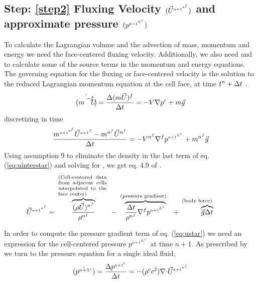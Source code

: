 \documentclass[fleqn]{article}
\begin{document}
\subsection{Step: \ref{step2}  \textsf{Fluxing Velocity $(\ustar)$ and approximate pressure $(\pnnLc)$}}
To calculate the Lagrangian volume and the advection of mass, momentum and
energy we need the face-centered fluxing velocity.  Additionally, we also
need \pstar and \delpc to calculate some of the source terms in the momentum
and energy equations. The governing equation for the fluxing or face-centered
velocity is the solution to the reduced Lagrangian momentum equation at the
cell face, at time $t^n + \delt$ .
%
\begin{equation*}
\dot{(m\vec{U}^{f} )}
= \frac{  \Delta{ (m\vec{U})^{f} }  }{  \delt  } 
= -V\nabla{p^c} + m\vec{g}
\end{equation*}
%
discretizing in time
%
\begin{equation}
\label{eq:uinterstar} 
    \frac{  m^{\nadv^{*^{f}}}\unnf - \mnf\unf  }{  \delt}
    = -\Vnf\nabla^f p^{\nadv^{L^{c}}} + \mnf \vec{g} 
\end{equation}
%
Using assumption 9 to eliminate the density in the last term of eq. (\ref{eq:uinterstar}) and solving for \ustar, we get eq. 4.9 of .
%
\begin{equation}
\label{eq:ustar}
    \ustar = 
    \overbrace{ \frac{ (\rho\vec{U})^{n^{f}} }{ \rhonf} }^{  
    \text{  \pboxsmall{   (Cell-centered data from adjacent cells interpolated to the face center)}  } } 
-   \overbrace{ \frac{ \delt }{\rhonf }\nabla^f\pnnLc  }^{ 
    \text{  \pboxsmall{   (pressure gradient)} } }
+   \overbrace{ \vec{g}  \delt  }^{
    \text{  \pboxsmall{   (body force)}  } }  
\end{equation}

%
In order to compute the pressure gradient term of eq. (\ref{eq:ustar}) we
need an expression for the cell-centered pressure $\pnnLc$ at time $n+1.$
As prescribed by  we turn to the pressure equation for a
single ideal fluid,
% 
\begin{equation}
    \label{eq:press_eq}
    \dot{(p^{{n+1}^{c}})} = \frac{  \delpc  }{  \delt  } =
    -(\rho^c c^2) \nabla{\cdot \ustar}
\end{equation}
%
%
\end{document}
